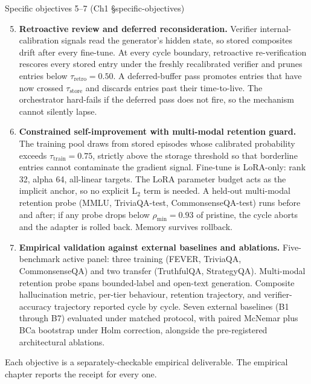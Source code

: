 \documentclass[10pt,aspectratio=169]{beamer}
\begin{document}
\begin{frame}{Specific objectives 5--7 (Ch1 \S specific-objectives)}
  \scriptsize
  \begin{enumerate}\setcounter{enumi}{4}
    \item \textbf{Retroactive review and deferred reconsideration.} Verifier internal-calibration signals read the generator's hidden state, so stored composites drift after every fine-tune. At every cycle boundary, retroactive re-verification rescores every stored entry under the freshly recalibrated verifier and prunes entries below $\tau_{\text{retro}}=0.50$. A deferred-buffer pass promotes entries that have now crossed $\tau_{\text{store}}$ and discards entries past their time-to-live. The orchestrator hard-fails if the deferred pass does not fire, so the mechanism cannot silently lapse.
    \item \textbf{Constrained self-improvement with multi-modal retention guard.} The training pool draws from stored episodes whose calibrated probability exceeds $\tau_{\text{train}}=0.75$, strictly above the storage threshold so that borderline entries cannot contaminate the gradient signal. Fine-tune is LoRA-only: rank 32, alpha 64, all-linear targets. The LoRA parameter budget acts as the implicit anchor, so no explicit L$_2$ term is needed. A held-out multi-modal retention probe (MMLU, TriviaQA-test, CommonsenseQA-test) runs before and after; if any probe drops below $\rho_{\min}=0.93$ of pristine, the cycle aborts and the adapter is rolled back. Memory survives rollback.
    \item \textbf{Empirical validation against external baselines and ablations.} Five-benchmark active panel: three training (FEVER, TriviaQA, CommonsenseQA) and two transfer (TruthfulQA, StrategyQA). Multi-modal retention probe spans bounded-label and open-text generation. Composite hallucination metric, per-tier behaviour, retention trajectory, and verifier-accuracy trajectory reported cycle by cycle. Seven external baselines (B1 through B7) evaluated under matched protocol, with paired McNemar plus BCa bootstrap under Holm correction, alongside the pre-registered architectural ablations.
  \end{enumerate}

  \vspace{0.3em}
  {\scriptsize Each objective is a separately-checkable empirical deliverable. The empirical chapter reports the receipt for every one.}
\end{frame}
\end{document}
